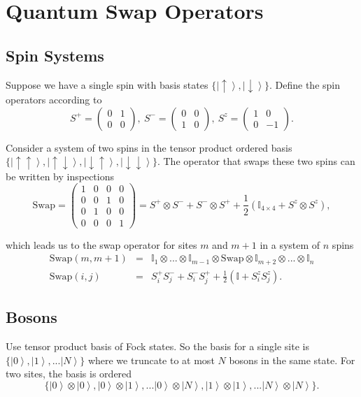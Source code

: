 \documentclass{article}
\newcommand{\ket}[1]{\left| #1 \right>} %
\theoremstyle{definition}
\begin{document}
\section{Quantum Swap Operators}

\subsection{Spin Systems}
Suppose we have a single spin with basis states $\{\ket{\uparrow},\ket{\downarrow}\}$. Define the spin operators according to 
\begin{equation}
S^+ = 
\begin{pmatrix}
0 & 1\\
0 & 0
\end{pmatrix}, \
S^- =
\begin{pmatrix}
0 & 0\\
1 & 0
\end{pmatrix}, \
S^z =
\begin{pmatrix}
1 & 0\\
0 & -1
\end{pmatrix}.
\end{equation}

Consider a system of two spins in the tensor product ordered basis $\{\ket{\uparrow \uparrow},\ket{\uparrow \downarrow},\ket{\downarrow \uparrow},\ket{\downarrow \downarrow}\}$. The operator that swaps these two spins can be written by inspections
\begin{equation}
\text{Swap} =
\begin{pmatrix}
1 & 0 & 0 & 0\\
0 & 0 & 1 & 0\\
0 & 1 & 0 & 0\\
0 & 0 & 0 & 1
\end{pmatrix} = S^+ \otimes S^- + S^- \otimes S^+ + \frac{1}{2} \left(\mathbb{I}_{4 \times 4} + S^z \otimes S^z \right),
\end{equation}


which leads us to the swap operator for sites $m$ and $m+1$ in a system of $n$ spins
\begin{eqnarray}
\text{Swap$(m,m+1)$} &=& \mathbb{I}_1 \otimes ... \otimes \mathbb{I}_{m-1} \otimes \text{Swap} \otimes \mathbb{I}_{m+2} \otimes ... \otimes \mathbb{I}_{n}\\
\text{Swap$(i,j)$} &=& S^+_i S^-_j + S^-_i S^+_j + \frac{1}{2} \left(\mathbb{I} + S^z_i S^z_j \right).
\end{eqnarray}

\subsection{Bosons}
Use tensor product basis of Fock states. So the basis for a single site is $\{\ket{0},\ket{1},...\ket{N}\}$ where we truncate to at most $N$ bosons in the same state. For two sites, the basis is ordered 
\begin{equation}
\{\ket{0}\otimes \ket{0}, \ket{0}\otimes\ket{1},...\ket{0}\otimes\ket{N},\ket{1}\otimes\ket{1},...\ket{N}\otimes\ket{N}\}.
\end{equation}
\end{document}
